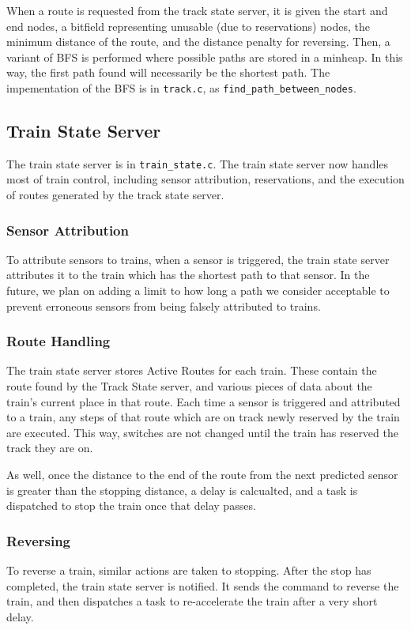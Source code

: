 \documentclass{article}
\begin{document}
When a route is requested from the track state server, it is given the start and end nodes, a bitfield representing unusable (due to reservations) nodes, the minimum distance of the route, and the distance penalty for reversing. Then, a variant of BFS is performed where possible paths are stored in a minheap. In this way, the first path found will necessarily be the shortest path. 
The impementation of the BFS is in \verb|track.c|, as \verb|find_path_between_nodes|.

\subsection{ Train State Server}
The train state server is in \verb|train_state.c|.
The train state server now handles most of train control, including sensor attribution, reservations, and the execution of routes generated by the track state server.
\subsubsection{ Sensor Attribution}
To attribute sensors to trains, when a sensor is triggered, the train state server attributes it to the train which has the shortest path to that sensor.
In the future, we plan on adding a limit to how long a path we consider acceptable to prevent erroneous sensors from being falsely attributed to trains.
\subsubsection{ Route Handling}
The train state server stores Active Routes for each train. These contain the route found by the Track State server, and various pieces of data about the train's current place in that route.
Each time a sensor is triggered and attributed to a train, any steps of that route which are on track newly reserved by the train are executed. This way, switches are not changed until the train has reserved the track they are on.

As well, once the distance to the end of the route from the next predicted sensor is greater than the stopping distance, a delay is calcualted, and a task is dispatched to stop the train once that delay passes.
\subsubsection{ Reversing}
To reverse a train, similar actions are taken to stopping. After the stop has completed, the train state server is notified. It sends the command to reverse the train, and then dispatches a task to re-accelerate the train after a very short delay.
\end{document}
